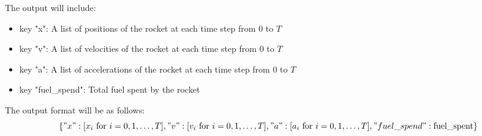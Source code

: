 \documentclass{article}
\begin{document}
The output will include:
\begin{itemize}
    \item key "x": A list of positions of the rocket at each time step from \( 0 \) to \( T \)
    \item key "v": A list of velocities of the rocket at each time step from \( 0 \) to \( T \)
    \item key "a": A list of accelerations of the rocket at each time step from \( 0 \) to \( T \)
    \item key "fuel\_spend": Total fuel spent by the rocket
\end{itemize}

The output format will be as follows:
\[
\{
    "x": [x_i \text{ for } i = 0, 1, \ldots, T],
    "v": [v_i \text{ for } i = 0, 1, \ldots, T],
    "a": [a_i \text{ for } i = 0, 1, \ldots, T],
    "fuel\_spend": \text{fuel\_spent}
\}
\]
\end{document}
